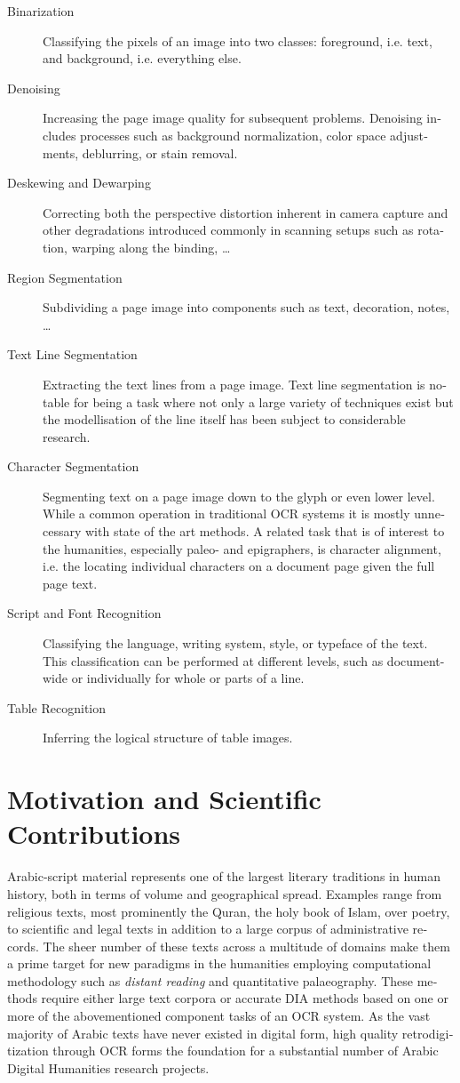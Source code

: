 \begin{french}
\begin{description}
\item [Binarization] Classifying the pixels of an image into two classes:
foreground, i.e. text, and background, i.e. everything else.
\item [Denoising] Increasing the page image quality for subsequent problems.
Denoising includes processes such as background normalization, color space
adjustments, deblurring, or stain removal.
\item [Deskewing and Dewarping] Correcting both the perspective distortion
inherent in camera capture and other degradations introduced commonly in
scanning setups such as rotation, warping along the binding, \dots
\item [Region Segmentation] Subdividing a page image into components such as text, decoration, notes, \dots
\item [Text Line Segmentation] Extracting the text lines from a page image.
Text line segmentation is notable for being a task where not only a large
variety of techniques exist but the modellisation of the line itself has been
subject to considerable research.
\item [Character Segmentation] Segmenting text on a page image down to the
glyph or even lower level. While a common operation in traditional OCR systems
it is mostly unnecessary with state of the art methods. A related task that is
of interest to the humanities, especially paleo- and epigraphers, is character
alignment, i.e. the locating individual characters on a document page given the
full page text.
\item [Script and Font Recognition] Classifying the language, writing system,
style, or typeface of the text. This classification can be performed at
different levels, such as document-wide or individually for whole or parts of a
line.
\item [Table Recognition] Inferring the logical structure of table images.
\end{description}

\section{Motivation and Scientific Contributions}

Arabic-script material represents one of the largest literary traditions in
human history, both in terms of volume and geographical spread. Examples range
from religious texts, most prominently the Quran, the holy book of Islam, over
poetry, to scientific and legal texts in addition to a large corpus of
administrative records. The sheer number of these texts across a multitude of
domains make them a prime target for new paradigms in the humanities employing
computational methodology such as \emph{distant reading} and quantitative
palaeography. These methods require either large text corpora or accurate DIA
methods based on one or more of the abovementioned component tasks of an OCR
system. As the vast majority of Arabic texts have never existed in digital
form, high quality retrodigitization through OCR forms the foundation for a
substantial number of Arabic Digital Humanities research projects.


\end{french}

